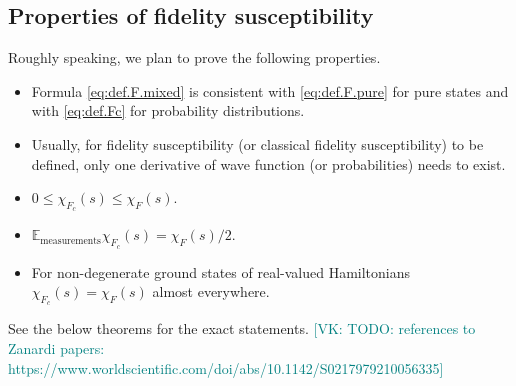 \documentclass[
  american,aps,pra,reprint,floatfix,nofootinbib,superscriptaddress
]{revtex4-2}
\newcommand{\VK}[1]{\textcolor{teal}{[VK: #1]}}
\begin{document}
\subsection{Properties of fidelity susceptibility}
Roughly speaking, we plan to prove the following properties.
\begin{itemize}
  \item Formula \eqref{eq:def.F.mixed} is consistent with \eqref{eq:def.F.pure}
    for pure states and with \eqref{eq:def.Fc} for probability distributions.
  \item Usually, for fidelity susceptibility (or classical fidelity
    susceptibility) to be defined, only one derivative of wave function
    (or probabilities) needs to exist.
  \item $0 \leq \chi_{F_c}(s) \leq \chi_F(s)$.
  \item $\mathbb{E}_{\textrm{measurements}} \chi_{F_c}(s) = \chi_F(s)/2$.
  \item For non-degenerate ground states of real-valued Hamiltonians
  $\chi_{F_c}(s) = \chi_F(s)$ almost everywhere.
\end{itemize}
See the below theorems for the exact statements.
\VK{TODO: references to Zanardi papers: https://www.worldscientific.com/doi/abs/10.1142/S0217979210056335}
\end{document}
